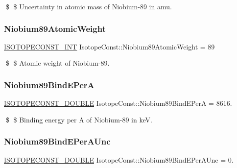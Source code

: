 \$ \$ Uncertainty in atomic mass of Niobium-\/89 in amu. \mbox{\label{group___isotope_const-_niobium-_nb89_ga40da4641017d83974969124e03d09450}} 
\subsubsection{\texorpdfstring{Niobium89\+Atomic\+Weight}{Niobium89AtomicWeight}}
{\footnotesize\ttfamily \mbox{\hyperlink{group___isotope_const-_macros_ga5f18360b3e99483a35c32d789e62621c}{I\+S\+O\+T\+O\+P\+E\+C\+O\+N\+S\+T\+\_\+\+I\+NT}} Isotope\+Const\+::\+Niobium89\+Atomic\+Weight = 89}

\$ \$ Atomic weight of Niobium-\/89. \mbox{\label{group___isotope_const-_niobium-_nb89_gad890d77f399f98fdcb62252244e6446d}} 
\subsubsection{\texorpdfstring{Niobium89\+Bind\+E\+PerA}{Niobium89BindEPerA}}
{\footnotesize\ttfamily \mbox{\hyperlink{group___isotope_const-_macros_ga8f45a7272ce02c0b4c65c44636ed719a}{I\+S\+O\+T\+O\+P\+E\+C\+O\+N\+S\+T\+\_\+\+D\+O\+U\+B\+LE}} Isotope\+Const\+::\+Niobium89\+Bind\+E\+PerA = 8616.}

\$ \$ Binding energy per A of Niobium-\/89 in keV. \mbox{\label{group___isotope_const-_niobium-_nb89_ga6f17f8f4389ba2fa4a35700eac325a3d}} 
\subsubsection{\texorpdfstring{Niobium89\+Bind\+E\+Per\+A\+Unc}{Niobium89BindEPerAUnc}}
{\footnotesize\ttfamily \mbox{\hyperlink{group___isotope_const-_macros_ga8f45a7272ce02c0b4c65c44636ed719a}{I\+S\+O\+T\+O\+P\+E\+C\+O\+N\+S\+T\+\_\+\+D\+O\+U\+B\+LE}} Isotope\+Const\+::\+Niobium89\+Bind\+E\+Per\+A\+Unc = 0.}

